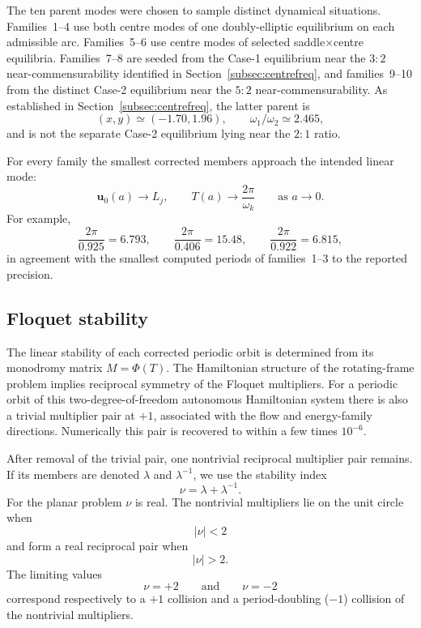 The ten parent modes were chosen to sample distinct dynamical situations.
Families~1--4 use both centre modes of one doubly-elliptic equilibrium on
each admissible arc. Families~5--6 use centre modes of selected
saddle$\times$centre equilibria. Families~7--8 are seeded from the
Case-1 equilibrium near the $3{:}2$ near-commensurability identified in
Section~\ref{subsec:centrefreq}, and families~9--10 from the distinct
Case-2 equilibrium near the $5{:}2$ near-commensurability. As established
in Section~\ref{subsec:centrefreq}, the latter parent is
\[
(x,y)\simeq(-1.70,1.96),
\qquad
\omega_1/\omega_2\simeq2.465,
\]
and is not the separate Case-2 equilibrium lying near the $2{:}1$ ratio.

For every family the smallest corrected members approach the intended
linear mode:
\[
\mathbf u_0(a)\rightarrow L_j,
\qquad
T(a)\rightarrow\frac{2\pi}{\omega_k}
\qquad\text{as }a\rightarrow0.
\]
For example,
\[
\frac{2\pi}{0.925}=6.793,\qquad
\frac{2\pi}{0.406}=15.48,\qquad
\frac{2\pi}{0.922}=6.815,
\]
in agreement with the smallest computed periods of families~1--3 to the
reported precision.


\subsection{Floquet stability}
\label{subsec:floquet}

The linear stability of each corrected periodic orbit is determined from
its monodromy matrix $M=\Phi(T)$. The Hamiltonian structure of the
rotating-frame problem implies reciprocal symmetry of the Floquet
multipliers. For a periodic orbit of this two-degree-of-freedom autonomous
Hamiltonian system there is also a trivial multiplier pair at $+1$,
associated with the flow and energy-family directions. Numerically this
pair is recovered to within a few times $10^{-6}$.

After removal of the trivial pair, one nontrivial reciprocal multiplier
pair remains. If its members are denoted $\lambda$ and $\lambda^{-1}$, we
use the stability index
\begin{equation}
\nu
=
\lambda+\lambda^{-1}.
\label{eq:floquet_index}
\end{equation}
For the planar problem $\nu$ is real. The nontrivial multipliers lie on the
unit circle when
\[
|\nu|<2
\]
and form a real reciprocal pair when
\[
|\nu|>2.
\]
The limiting values
\[
\nu=+2
\qquad\text{and}\qquad
\nu=-2
\]
correspond respectively to a $+1$ collision and a period-doubling
($-1$) collision of the nontrivial multipliers.


